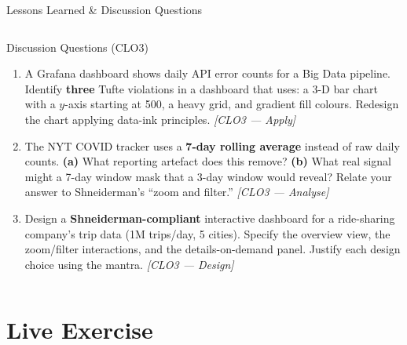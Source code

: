 \documentclass[aspectratio=169,10pt]{beamer}
\begin{document}
\begin{frame}{Lessons Learned \& Discussion Questions}
\begin{columns}[T]
      \begin{alertblock}{Discussion Questions \textmd{\tiny (CLO3)}}
        \begin{enumerate}
          \item A Grafana dashboard shows daily API error counts
                for a Big Data pipeline.
                Identify \textbf{three} Tufte violations in a
                dashboard that uses: a 3-D bar chart with a
                $y$-axis starting at 500, a heavy grid, and
                gradient fill colours.
                Redesign the chart applying data-ink principles.
                \textit{[CLO3 — Apply]}
          \item The NYT COVID tracker uses a \textbf{7-day rolling
                average} instead of raw daily counts.
                \textbf{(a)} What reporting artefact does this
                remove?
                \textbf{(b)} What real signal might a 7-day window
                mask that a 3-day window would reveal?
                Relate your answer to Shneiderman's ``zoom and filter.''
                \textit{[CLO3 — Analyse]}
          \item Design a \textbf{Shneiderman-compliant} interactive
                dashboard for a ride-sharing company's trip data
                (1M trips/day, 5 cities).
                Specify the overview view, the zoom/filter interactions,
                and the details-on-demand panel.
                Justify each design choice using the mantra.
                \textit{[CLO3 — Design]}
        \end{enumerate}
      \end{alertblock}
  \end{columns}
\end{frame}

\section{Live Exercise}
\end{document}
